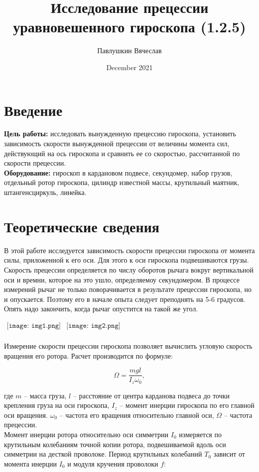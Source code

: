 \documentclass[a4paper,12pt]{article}
\title{\textbf{Исследование прецессии уравновешенного гироскопа (1.2.5)}}
\author{Павлушкин Вячеслав}
\date{December 2021}
\begin{document}
	
	\maketitle
	
	\section{Введение}
	
	\textbf{Цель работы:} исследовать вынужденную прецессию гироскопа, установить зависимость скорости вынужденной прецессии от величины момента сил, действующий на ось гироскопа и сравнить ее со скоростью, рассчитанной по скорости прецессии.\\
	\textbf{Оборудование:} гироскоп в кардановом подвесе, секундомер, набор грузов, отдельный ротор гироскопа, цилиндр известной массы, крутильный маятник, штангенсциркуль, линейка.
	
	\section{Теоретические сведения}
	
	В этой работе исследуется зависимость скорости прецессии гироскопа от момента силы, приложенной к его оси. Для этого к оси гироскопа подвешиваются грузы. Скорость прецессии определяется по числу оборотов рычага вокруг вертикальной оси и времни, которое на это ушло, определяемоу секундомером. В процессе измерений рычаг не только поворачивается в результате прецессии гироскопа, но и опускается. Поэтому его в начале опыта следует преподнять на 5-6 градусов.  Опять надо закончить, когда рычаг опустится на такой же угол.\\
	\begin{center}$
		\begin{array}{cc}
			\texttt{[image: img1.png]}&
			\texttt{[image: img2.png]}\\
		\end{array}$
	\end{center}
	
	Измерение скорости прецессии гироскопа позволяет вычислить угловую скорость вращения его ротора. Расчет производится по формуле:
	
	\begin{equation}
		\Omega = \frac{mgl}{I_z\omega_0},
	\end{equation}
	
	где $m$ -- масса груза, $l$ -- расстояние от центра карданова подвеса до точки крепления груза на оси гироскопа, $I_z$ -- момент инерции гироскопа по его главной оси вращения. $\omega_0$ -- частота его вращения относительно главной оси, $\Omega$ -- частота прецессии.\\
	Момент инерции ротора относительно оси симметрии $I_0$ измеряется по крутильным колебаниям точной копии ротора, подвешиваемой вдоль оси симметрии на десткой проволоке. Период крутильных колебаний $T_0$ зависит от момента инерции $I_0$ и модуля кручения проволоки $f$:
	
\end{document}
